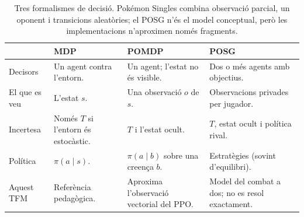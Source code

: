 \begin{table}[htbp]
\centering
\caption{Tres formalismes de decisió. Pokémon Singles combina observació parcial, un oponent i transicions aleatòries; el POSG n'és el model conceptual, però les implementacions n'aproximen només fragments.}
\label{tab:mdp_pomdp_posg}
\small
\renewcommand{\arraystretch}{1.3}
\begin{tabularx}{\textwidth}{l>{\raggedright\arraybackslash}X>{\raggedright\arraybackslash}X>{\raggedright\arraybackslash}X}
\toprule
 & \textbf{MDP} & \textbf{POMDP} & \textbf{POSG} \\
\midrule
Decisors & Un agent contra l'entorn. & Un agent; l'estat no és visible. & Dos o més agents amb objectius. \\
\arrayrulecolor{gray!30}\hline\arrayrulecolor{black}
El que es veu & L'estat $s$. & Una observació $o$ de $s$. & Observacions privades per jugador. \\
\arrayrulecolor{gray!30}\hline\arrayrulecolor{black}
Incertesa & Només $T$ si l'entorn és estocàstic. & $T$ i l'estat ocult. & $T$, estat ocult i política rival. \\
\arrayrulecolor{gray!30}\hline\arrayrulecolor{black}
Política & $\pi(a\mid s)$. & $\pi(a\mid b)$ sobre una creença $b$. & Estratègies (sovint d'equilibri). \\
\arrayrulecolor{gray!30}\hline\arrayrulecolor{black}
Aquest TFM & Referència pedagògica. & Aproxima l'observació vectorial del PPO. & Model del combat a dos; no es resol exactament. \\
\bottomrule
\end{tabularx}
\end{table}
